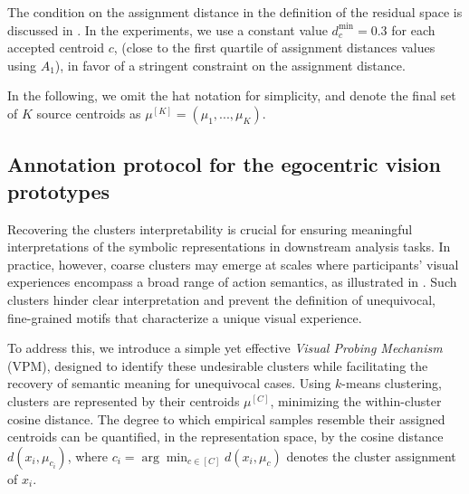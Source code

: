         \begin{rmk}
            The condition on the assignment distance in the definition of the residual space is discussed in . In the experiments, we use a constant value $d_c^{\text{min}}=0.3$ for each accepted centroid $c$, (close to the first quartile of assignment distances values using $A_1$), in favor of a stringent constraint on the assignment distance. 
        \end{rmk}       
        
        In the following, we omit the hat notation for simplicity, and denote the final set of $K$ source centroids as $\mu^{[K]} = (\mu_1, ..., \mu_K)$.



    \subsection{Annotation protocol for the egocentric vision prototypes}
        \label{sec:chapter_5_annotation}

        Recovering the clusters interpretability is crucial for ensuring meaningful interpretations of the symbolic representations in downstream analysis tasks. In practice, however, coarse clusters may emerge at scales where participants' visual experiences encompass a broad range of action semantics, as illustrated in . Such clusters hinder clear interpretation and prevent the definition of unequivocal, fine-grained motifs that characterize a unique visual experience.

        To address this, we introduce a simple yet effective \emph{Visual Probing Mechanism} (VPM), designed to identify these undesirable clusters while facilitating the recovery of semantic meaning for unequivocal cases. Using $k$-means clustering, clusters are represented by their centroids $\mu^{[C]}$,  minimizing the within-cluster cosine distance. The degree to which empirical samples resemble their assigned centroids can be quantified, in the representation space, by the cosine distance $d(x_i, \mu_{c_i})$, where $c_i = \arg \min_{c \in [C]} d(x_i, \mu_c)$ denotes the cluster assignment of $x_i$.  

